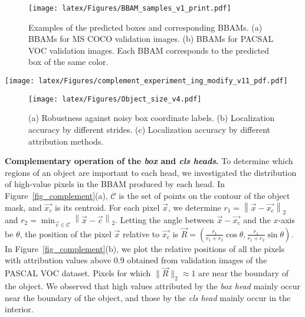 \documentclass[final]{cvpr}
\begin{document}
\begin{figure}[t]
  \centering
\texttt{[image: latex/Figures/BBAM\_samples\_v1\_print.pdf]} \\[-0.5em]
  \caption{\label{BBAM_samples_total} Examples of the predicted boxes and corresponding BBAMs. (a) BBAMs for MS COCO validation images. (b) BBAMs for PACSAL VOC validation images. Each BBAM corresponds to the predicted box of the same color.}
  \vspace{-1.2em}
\end{figure} \begin{figure*}[t]
  \centering
  \texttt{[image: latex/Figures/complement\_experiment\_ing\_modify\_v11\_pdf.pdf]} \\[-0.7em]
  \caption{\label{fig_complement} Complementary operation of the \textit{box head} and the \textit{cls head}. (a) The definition of relative position. (b) Relative positions of the highly activated pixels from each head. (c) \textit{Box} and \textit{class} loss curves.}
  \vspace{-1.2em}
\end{figure*} 
\begin{figure}[t]
\centering
\texttt{[image: latex/Figures/Object\_size\_v4.pdf]}
\vspace{-1.5em}
\caption{\label{noise_robust} (a) Robustness against noisy box coordinate labels. (b) Localization accuracy by different strides. (c) Localization accuracy by different attribution methods.}
\vspace{-1em}
\end{figure} 
\textbf{Complementary operation of the \textit{box} and \textit{cls heads}.}
To determine which regions of an object are important to each head, we investigated the distribution of high-value pixels in the BBAM produced by each head.
In Figure~\ref{fig_complement}(a), $\mathcal{C}$ is the set of points on the contour of the object mask, and $\vec{x_c}$ is its centroid.
For each pixel $\vec{x}$, we determine $r_1=\left\lVert \vec{x} - \vec{x_c} \right\rVert_2$ and $r_2 = \min_{\vec{c} \in \mathcal{C}} \left\lVert \vec{x} - \vec{c} \right\rVert_2$.
Letting the angle between $\vec{x}-\vec{x_c}$ and the $x$-axis be $\theta$, the position of the pixel $\vec{x}$ relative to $\vec{x_c}$ is $\vec{R}=(\frac{r_1}{r_1+r_2}\cos\theta, \frac{r_1}{r_1+r_2}\sin\theta)$.
In Figure~\ref{fig_complement}(b), we plot the relative positions of all the pixels with attribution values above 0.9 obtained from validation images of the PASCAL VOC dataset.
Pixels for which $\lVert \vec{R} \rVert_2 \approx 1$ are near the boundary of the object.
We observed that high values attributed by the \textit{box head} mainly occur near the boundary of the object, and those by the \textit{cls head} mainly occur in the interior.
\end{document}
